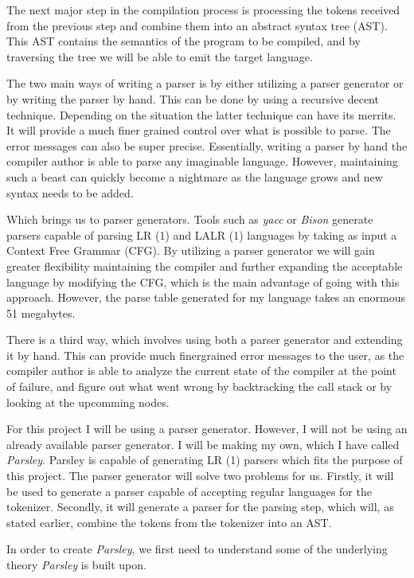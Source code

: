 The next major step in the compilation process is processing the tokens received from the previous step and combine them into an abstract syntax tree (AST). This AST contains the semantics of the program to be compiled, and by traversing the tree we will be able to emit the target language. 

The two main ways of writing a parser is by either utilizing a parser generator or by writing the parser by hand. This can be done by using a recursive decent technique. Depending on the situation the latter technique can have its merrits. It will provide a much finer grained control over what is possible to parse. The error messages can also be super precise. Essentially, writing a parser by hand the compiler author is able to parse any imaginable language. However, maintaining such a beast can quickly become a nightmare as the language grows and new syntax needs to be added. 

Which brings us to parser generators. Tools such as \textit{yacc} or \textit{Bison} generate parsers capable of parsing LR (1) and LALR (1) languages by taking as input a Context Free Grammar (CFG). By utilizing a parser generator we will gain greater flexibility maintaining the compiler and further expanding the acceptable language by modifying the CFG, which is the main advantage of going with this approach. However, the parse table generated for my language takes an enormous 51 megabytes. 

There is a third way, which involves using both a parser generator and extending it by hand. This can provide much finergrained error messages to the user, as the compiler author is able to analyze the current state of the compiler at the point of failure, and figure out what went wrong by backtracking the call stack or by looking at the upcomming nodes.

For this project I will be using a parser generator. However, I will not be using an already available parser generator. I will be making my own, which I have called \textit{Parsley}. Parsley is capable of generating LR (1) parsers which fits the purpose of this project. The parser generator will solve two problems for us. Firstly, it will be used to generate a parser capable of accepting regular languages for the tokenizer. Secondly, it will generate a parser for the parsing step, which will, as stated earlier, combine the tokens from the tokenizer into an AST.

In order to create \textit{Parsley}, we first need to understand some of the underlying theory \textit{Parsley} is built upon. 

